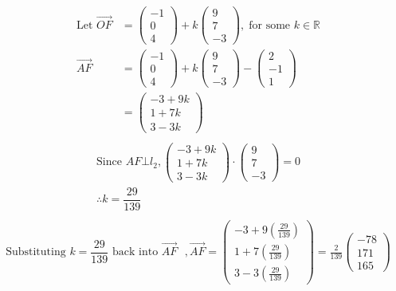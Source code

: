 \documentclass[12pt, a4 paper]{article}
\begin{document}
\begin{outline}[enumerate]
					\color{blue}   
					\begin{align*}
						{\textrm{Let }}\overrightarrow {OF} & = \left( {\begin{array}{*{20}{c}}{ - 1} \\0\\4\end{array}} \right) + k\left( {\begin{array}{*{20}{c}}9\\7\\{ - 3}\end{array}} \right),\;{\textrm{for some }}k \in \mathbb{R}\\\overrightarrow {AF}  &= \left( {\begin{array}{*{20}{c}}{ - 1}\\0\\4\end{array}} \right) + k\left( {\begin{array}{*{20}{c}}9\\7\\{ - 3}\end{array}} \right) - \left( {\begin{array}{*{20}{c}}2\\{ - 1}\\1\end{array}} \right)\\ &= \left( {\begin{array}{*{20}{c}}{ - 3 + 9k}\\{1 + 7k}\\{3 - 3k}\end{array}} \right)\\
					\end{align*}
					\begin{align*}
						{\textrm{Since }}AF \bot {l_2},\left( {\begin{array}{*{20}{c}}{ - 3 + 9k} \\{1 + 7k}\\{3 - 3k}\end{array}} \right) \cdot \left( {\begin{array}{*{20}{c}}9\\7\\{ - 3}\end{array}} \right) = 0\\\therefore k = \dfrac{{29}}{{139}}\\
					\end{align*}
					\begin{align*}
						{\textrm{Substituting }}k = \dfrac{{29}}{{139}}{\textrm{ back into }}\overrightarrow {AF}{\textrm{ }},\overrightarrow {AF}  = \left( {\begin{array}{*{20}{c}}{ - 3 + 9\left( {\frac{{29}}{{139}}} \right)} \\{1 + 7\left( {\frac{{29}}{{139}}} \right)}\\{3 - 3\left( {\frac{{29}}{{139}}} \right)}\end{array}} \right) = \frac{2}{{139}}\left( {\begin{array}{*{20}{c}}{ - 78}\\{171}\\{165}\end{array}} \right)

\end{align*}
\end{outline}
\end{document}

